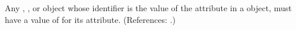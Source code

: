 Any \Compartment, \Species, \Parameter or \SpeciesReference object whose
identifier is the value of the attribute  in a \RateRule
object, must have a value of  for its 
attribute.  (References: .)
